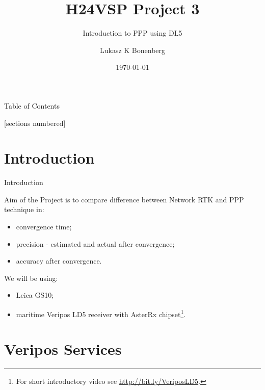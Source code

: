 \documentclass[11pt]{beamer}
\title[H24VSP]{H24VSP Project 3}
\subtitle{Introduction to PPP using DL5}
\author{Lukasz K Bonenberg}
\institute{NGI}
\date{\today}
\begin{document}
\maketitle

\begin{frame}{Table of Contents}

  [sections numbered]
  \tableofcontents[hideallsubsections]
\end{frame}


\section{Introduction}

\begin{frame}[fragile]{Introduction}

	Aim of the Project is to compare difference between Network RTK and PPP technique in:
	\begin{itemize}
		\item convergence time;
		\item precision - estimated and actual after convergence; 
		\item accuracy after convergence.
	\end{itemize}
	
	We will be using:
	\begin{itemize}
		\item Leica GS10;
		\item maritime Veripos LD5 receiver with AsterRx chipset\footnote[frame]{For short introductory video see \url{http://bit.ly/VeriposLD5}.}.
	\end{itemize}
\end{frame}

\section{Veripos Services}
\end{document}

